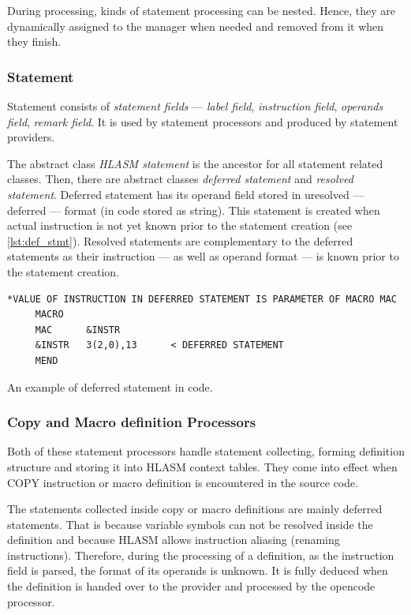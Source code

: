 During processing, kinds of statement processing can be nested. Hence, they are dynamically assigned to the manager when needed and removed from it when they finish.

\subsubsection{Statement}

Statement consists of \emph{statement fields} --- \emph{label field}, \emph{instruction field}, \emph{operands field}, \emph{remark field}. It is used by statement processors and produced by statement providers. 

The abstract class \emph{HLASM statement} is the ancestor for all statement related classes. Then, there are abstract classes \emph{deferred statement} and \emph{resolved statement}. Deferred statement has its operand field stored in uresolved --- deferred --- format (in code stored as string). This statement is created when actual instruction is not yet known prior to the statement creation (see \cref{lst:def_stmt}). Resolved statements are complementary to the deferred statements as their instruction --- as well as operand format --- is known prior to the statement creation.

\begin{listing}[t]
	\begin{verbatim}
*VALUE OF INSTRUCTION IN DEFERRED STATEMENT IS PARAMETER OF MACRO MAC
     MACRO
     MAC      &INSTR
     &INSTR   3(2,0),13      < DEFERRED STATEMENT
     MEND
	\end{verbatim}
	\caption{An example of deferred statement in code.}
	\label{lst:def_stmt}
\end{listing}




\subsubsection{Copy and Macro definition Processors}

Both of these statement processors handle statement collecting, forming definition structure and storing it into HLASM context tables. They come into effect when COPY instruction or macro definition is encountered in the source code. 

The statements collected inside copy or macro definitions are mainly deferred statements. That is because variable symbols can not be resolved inside the definition and because HLASM allows instruction aliasing (renaming instructions). Therefore, during the processing of a definition, as the instruction field is parsed, the format of its operands is unknown. It is fully deduced when the definition is handed over to the provider and processed by the opencode processor.

